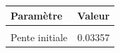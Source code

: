 \centering
\centering
\begin{tabular}[t]{lr}
\toprule
Paramètre & Valeur\\
\midrule
\cellcolor{gray!10}{Niveau initial} & \cellcolor{gray!10}{89.68500}\\
Pente initiale & 0.03357\\
\bottomrule
\end{tabular}

